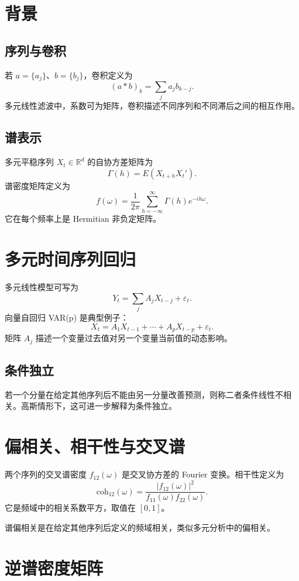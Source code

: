 \documentclass[11pt,a4paper,openany]{ctexbook}
\begin{document}
\section{背景}

\subsection{序列与卷积}

若 \(a=\{a_j\}\)、\(b=\{b_j\}\)，卷积定义为
\[
  (a*b)_k=\sum_j a_jb_{k-j}.
\]
多元线性滤波中，系数可为矩阵，卷积描述不同序列和不同滞后之间的相互作用。

\subsection{谱表示}

多元平稳序列 \(X_t\in\mathbb R^d\) 的自协方差矩阵为
\[
  \Gamma(h)=E(X_{t+h}X_t').
\]
谱密度矩阵定义为
\[
  f(\omega)=\frac1{2\pi}\sum_{h=-\infty}^{\infty}\Gamma(h)e^{-ih\omega}.
\]
它在每个频率上是 Hermitian 非负定矩阵。

\section{多元时间序列回归}

多元线性模型可写为
\[
  Y_t=\sum_{j}A_jX_{t-j}+\varepsilon_t.
\]
向量自回归 VAR(p) 是典型例子：
\[
  X_t=A_1X_{t-1}+\cdots+A_pX_{t-p}+\varepsilon_t.
\]
矩阵 \(A_j\) 描述一个变量过去值对另一个变量当前值的动态影响。

\subsection{条件独立}

若一个分量在给定其他序列后不能由另一分量改善预测，则称二者条件线性不相关。高斯情形下，这可进一步解释为条件独立。

\section{偏相关、相干性与交叉谱}

两个序列的交叉谱密度 \(f_{12}(\omega)\) 是交叉协方差的 Fourier 变换。相干性定义为
\[
  \mathrm{coh}_{12}(\omega)
  =\frac{|f_{12}(\omega)|^2}{f_{11}(\omega)f_{22}(\omega)}.
\]
它是频域中的相关系数平方，取值在 \([0,1]\)。

谱偏相关是在给定其他序列后定义的频域相关，类似多元分析中的偏相关。

\section{逆谱密度矩阵}
\end{document}
